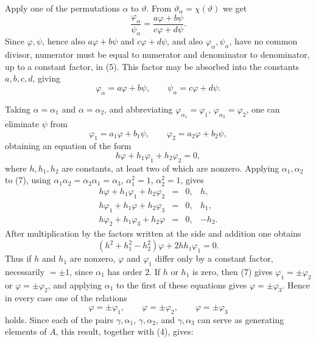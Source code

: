 \documentclass[11pt]{article}
\begin{document}
Apply one of the permutations \(\alpha\) to \(\vartheta\). From \(\vartheta_\alpha=\chi(\vartheta)\) we get
\begin{equation}
\frac{\varphi_\alpha}{\psi_\alpha}
=
\frac{a\varphi+b\psi}{c\varphi+d\psi}.
\tag{5}
\end{equation}
Since \(\varphi,\psi\), hence also \(a\varphi+b\psi\) and \(c\varphi+d\psi\), and also \(\varphi_\alpha,\psi_\alpha\), have no common divisor, numerator must be equal to numerator and denominator to denominator, up to a constant factor, in (5). This factor may be absorbed into the constants \(a,b,c,d\), giving
\begin{equation}
\varphi_\alpha=a\varphi+b\psi,\qquad
\psi_\alpha=c\varphi+d\psi.
\tag{6}
\end{equation}

Taking \(\alpha=\alpha_1\) and \(\alpha=\alpha_2\), and abbreviating \(\varphi_{\alpha_1}=\varphi_1\), \(\varphi_{\alpha_2}=\varphi_2\), one can eliminate \(\psi\) from
\[
\varphi_1=a_1\varphi+b_1\psi,\qquad
\varphi_2=a_2\varphi+b_2\psi,
\]
obtaining an equation of the form
\begin{equation}
h\varphi+h_1\varphi_1+h_2\varphi_2=0,
\tag{7}
\end{equation}
where \(h,h_1,h_2\) are constants, at least two of which are nonzero. Applying \(\alpha_1,\alpha_2\) to (7), using \(\alpha_1\alpha_2=\alpha_2\alpha_1=\alpha_3\), \(\alpha_1^2=1\), \(\alpha_2^2=1\), gives
\[
\begin{array}{rcll}
h\varphi+h_1\varphi_1+h_2\varphi_2&=&0,&h,\\
h\varphi_1+h_1\varphi+h_2\varphi_3&=&0,&h_1,\\
h\varphi_2+h_1\varphi_3+h_2\varphi&=&0,&-h_2.
\end{array}
\]
After multiplication by the factors written at the side and addition one obtains
\begin{equation}
(h^2+h_1^2-h_2^2)\varphi+2hh_1\varphi_1=0.
\tag{8}
\end{equation}
Thus if \(h\) and \(h_1\) are nonzero, \(\varphi\) and \(\varphi_1\) differ only by a constant factor, necessarily \(=\pm1\), since \(\alpha_1\) has order \(2\). If \(h\) or \(h_1\) is zero, then (7) gives \(\varphi_1=\pm\varphi_2\) or \(\varphi=\pm\varphi_2\), and applying \(\alpha_1\) to the first of these equations gives \(\varphi=\pm\varphi_3\). Hence in every case one of the relations
\begin{equation}
\varphi=\pm\varphi_1,\qquad
\varphi=\pm\varphi_2,\qquad
\varphi=\pm\varphi_3
\tag{9}
\end{equation}
holds. Since each of the pairs \(\gamma,\alpha_1\), \(\gamma,\alpha_2\), and \(\gamma,\alpha_3\) can serve as generating elements of \(A\), this result, together with (4), gives:
\end{document}
